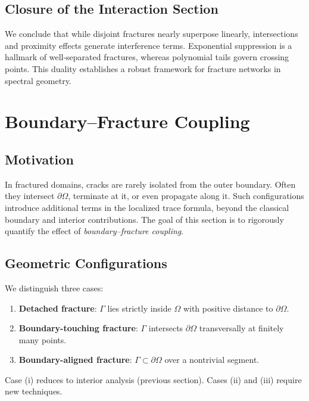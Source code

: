 \subsection*{Closure of the Interaction Section}

We conclude that while disjoint fractures nearly superpose linearly,
intersections and proximity effects generate interference terms.  
Exponential suppression is a hallmark of well-separated fractures,
whereas polynomial tails govern crossing points.  
This duality establishes a robust framework for fracture networks in
spectral geometry.

\section{Boundary--Fracture Coupling}
\label{sec:boundary-fracture}

\subsection{Motivation}

In fractured domains, cracks are rarely isolated from the outer
boundary.  
Often they intersect $\partial \Omega$, terminate at it, or even
propagate along it.  
Such configurations introduce additional terms in the localized trace
formula, beyond the classical boundary and interior contributions.  
The goal of this section is to rigorously quantify the effect of
\emph{boundary–fracture coupling}.

\subsection{Geometric Configurations}

We distinguish three cases:

\begin{enumerate}[label=(\roman*)]
  \item \textbf{Detached fracture}: $\Gamma$ lies strictly inside
  $\Omega$ with positive distance to $\partial \Omega$.
  \item \textbf{Boundary-touching fracture}: $\Gamma$ intersects
  $\partial \Omega$ transversally at finitely many points.
  \item \textbf{Boundary-aligned fracture}: $\Gamma \subset \partial
  \Omega$ over a nontrivial segment.
\end{enumerate}

Case (i) reduces to interior analysis (previous section).
Cases (ii) and (iii) require new techniques.

